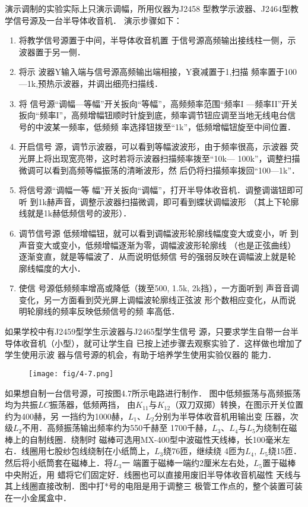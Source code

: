 演示调制的实验实际上只演示调幅，所用仪器为J2458
型教学示波器、J2464型教学信号源及一台半导体收音机．
演示步骤如下：
\begin{enumerate}
\item 将教学信号源置于中间，半导体收音机置
于信号源高频输出接线柱一侧，示波器置于另一侧．
\item 将示
波器Y输入端与信号源高频输出端相接，Y衰减置于1,扫描
频率置于100—1k,预热示波器，并调出细亮扫描线．
\item 将
信号源“调幅—等幅”开关扳向“等幅”，高频频率范围“频率I
—频率II”开关扳向“频率I”，高频增幅钮顺时针旋到底，频率调节钮应调至当地无线电台信号的中波某一频率，低频频
率选择钮拨至“1k”，低频增幅钮旋至中间位置．
\item 开启信号
源，调节示波器，可以看到等幅波波形，由于频率很高，示波器
荧光屏上将出现宽亮带，这时若将示波器扫描频率拨至“10k—
100k”，调整扫描微调可以看到高频等幅振荡的清晰波形，然
后仍将扫描频率拨回“100—1k”．
\item 将信号源“调幅一等
幅”开关扳向“调幅”，打开半导体收音机．调整调谐钮即可听
到1k赫声音，调整示波器扫描微调，即可看到蝶状调幅波形
（其上下轮廓线就是1k赫低频信号的波形）．
\item 调节信号源
低频增幅钮，就可以看到调幅波形轮廓线幅度变大或变小，听
到声音变大或变小，低频增幅逐渐为零，调幅波波形轮廓线
（也是正弦曲线）逐渐变直，就是等幅波了．从而说明低频信
号的强弱反映在调幅波上就是轮廓线幅度的大小．
\item 使信
号源低频频率增高或降低（拨至500, 1.5k, 2k挡），一方面听到
声音音调变化，另一方面看到荧光屏上调幅波轮廓线正弦波
形个数相应变化，从而说明轮廓线的频率反映低频信号的频
率高低．
\end{enumerate}


如果学校中有J2459型学生示波器与J2465型学生信号
源，只要求学生自带一台半导体收音机（小型），就可让学生自
已按上述步骤去观察实验了．这样做也增加了学生使用示波
器与信号源的机会，有助于培养学生使用实验仪器的
能力．

\begin{figure}[htp]
    \centering
\texttt{[image: fig/4-7.png]}
    \caption{}
\end{figure}

如果想自制一台信号源，可按图4.7所示电路进行制作．
图中低频振荡与高频振荡均为共振$LC$振荡器，低频两挡，
由$K_{11}$与$K_{12}$（双刀双掷）转换，在图示开关位置约为400赫，另
一挡约为1000赫，$L_1$、$L_2$分别为半导体收音机用输出变
压器，次级$L_2$不用．高频振荡输出频率约为550千赫至
1700千赫，$L_3$、$L_4$与$L_5$为绕制在磁棒上的自制线圈．绕制时
磁棒可选用MX-400型中波磁性天线棒，长100毫米左
右．线圈用七股纱包线绕制在小纸筒上，$L_3$绕76匝，继续绕
4匝为$L_4$, $L_5$绕15匝．然后将小纸筒套在磁棒上．将$L_3$一
端置于磁棒一端约2厘米左右处，$L_5$置于磁棒中央附近，用
蜡将它们固定好．线圈也可以直接用废旧半导体收音机磁性
天线与其上线圈直接改制．图中打*号的电阻是用于调整三
极管工作点的，整个装置可装在一小金属盒中．

